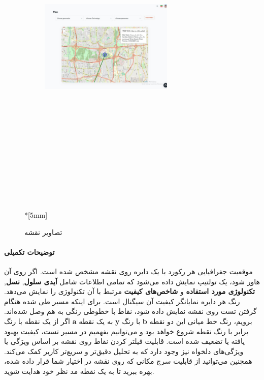 \documentclass{report}
\begin{document}
\begin{figure}[h]
\begin{subfigure}[b]{0.4\textwidth}
		\includegraphics[width=0.7\textwidth,height=15cm,keepaspectratio]{Pic/map2}
		\label{fig:map2}
	\end{subfigure}\\*[5mm]
	\caption{تصاویر نقشه}
	\label{fig:mapsPic}
\end{figure}
\paragraph{توضیحات تکمیلی}
موقعیت جغرافیایی هر رکورد با یک دایره روی نقشه مشخص شده است. اگر روی آن هاور شود، یک تولتیپ نمایش داده می‌شود که تمامی اطلاعات شامل \textbf{آیدی سلول}, \textbf{نسل}, \textbf{تکنولوژی مورد استفاده} و \textbf{شاخص‌های کیفیت} مرتبط با آن تکنولوژی را نمایش می‌دهد. رنگ هر دایره نمایانگر کیفیت آن سیگنال است.
برای اینکه مسیر طی شده هنگام گرفتن تست روی نقشه نمایش داده شود، نقاط با خطوطی رنگی به هم وصل شده‌اند. اگر از یک نقطه با رنگ \textbf{a} به یک نقطه \textbf{y} با رنگ \textbf{b} برویم، رنگ خط میانی این دو نقطه برابر با رنگ نقطه شروع خواهد بود و می‌توانیم بفهمیم در مسیر تست، کیفیت بهبود یافته یا تضعیف شده است.
قابلیت فیلتر کردن نقاط روی نقشه بر اساس ویژگی یا ویژگی‌های دلخواه نیز وجود دارد که به تحلیل دقیق‌تر و سریع‌تر کاربر کمک می‌کند. همچنین می‌توانید از قابلیت سرچ مکانی که روی نقشه در اختیار شما قرار داده شده، بهره ببرید تا به یک نقطه مد نظر خود هدایت شوید.
\end{document}
